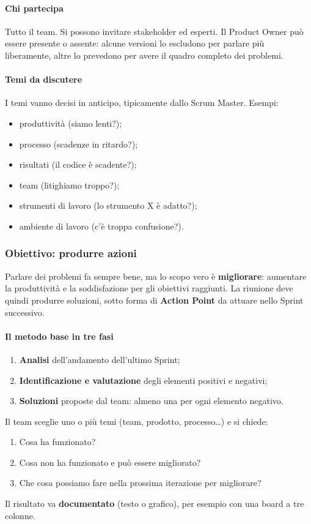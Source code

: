 \documentclass[a4paper,12pt]{article}
\begin{document}
\paragraph{Chi partecipa}
Tutto il team. Si possono invitare stakeholder ed esperti. Il Product Owner può essere
presente o assente: alcune versioni lo escludono per parlare più liberamente, altre lo
prevedono per avere il quadro completo dei problemi.

\paragraph{Temi da discutere}
I temi vanno decisi in anticipo, tipicamente dallo Scrum Master. Esempi:
\begin{itemize}[nosep]
  \item produttività (siamo lenti?);
  \item processo (scadenze in ritardo?);
  \item risultati (il codice è scadente?);
  \item team (litighiamo troppo?);
  \item strumenti di lavoro (lo strumento X è adatto?);
  \item ambiente di lavoro (c'è troppa confusione?).
\end{itemize}

\subsubsection{Obiettivo: produrre azioni}
Parlare dei problemi fa sempre bene, ma lo scopo vero è \textbf{migliorare}: aumentare la
produttività e la soddisfazione per gli obiettivi raggiunti. La riunione deve quindi
produrre soluzioni, sotto forma di \textbf{Action Point} da attuare nello Sprint successivo.

\paragraph{Il metodo base in tre fasi}
\begin{enumerate}[nosep]
  \item \textbf{Analisi} dell'andamento dell'ultimo Sprint;
  \item \textbf{Identificazione e valutazione} degli elementi positivi e negativi;
  \item \textbf{Soluzioni} proposte dal team: almeno una per ogni elemento negativo.
\end{enumerate}
Il team sceglie uno o più temi (team, prodotto, processo\ldots) e si chiede:
\begin{enumerate}[nosep]
  \item Cosa ha funzionato?
  \item Cosa non ha funzionato e può essere migliorato?
  \item Che cosa possiamo fare nella prossima iterazione per migliorare?
\end{enumerate}
Il risultato va \textbf{documentato} (testo o grafico), per esempio con una board a tre
colonne.
\end{document}
